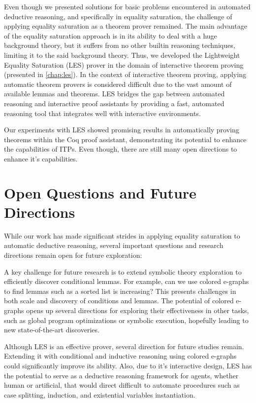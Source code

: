 Even though we presented solutions for basic problems encountered in automated deductive reasoning, and specifically in equality saturation, the challenge of applying equality saturation as a theorem prover remained.
The main advantage of the equality saturation approach is in its ability to deal with a huge background theory, but it suffers from no other builtin reasoning techniques, limiting it to the said background theory.
Thus, we developed the Lightweight Equality Saturation (LES) prover in the domain of interactive theorem proving (presented in \autoref{chap:les}).
In the context of interactive theorem proving, applying automatic theorem provers is considered difficult due to the vast amount of available lemmas and theorems.
LES bridges the gap between automated reasoning and interactive proof assistants by providing a fast, automated reasoning tool that integrates well with interactive environments. 

Our experiments with LES showed promising results in automatically proving theorems within the Coq proof assistant, demonstrating its potential to enhance the capabilities of ITPs.
Even though, there are still many open directions to enhance it's capabilities.

\section{Open Questions and Future Directions}

While our work has made significant strides in applying equality saturation to automatic deductive reasoning, several important questions and research directions remain open for future exploration:

A key challenge for future research is to extend symbolic theory exploration to efficiently discover conditional lemmas. 
For example, can we use colored e-graphs to find lemmas such as a sorted list is increasing? 
This presents challenges in both scale and discovery of conditions and lemmas.
The potential of colored e-graphs opens up several directions for exploring their effectiveness in other tasks, such as global program optimizations or symbolic execution, hopefully leading to new state-of-the-art discoveries.

Although LES is an effective prover, several direction for future studies remain. 
Extending it with conditional and inductive reasoning using colored e-graphs could significantly improve its ability.
Also, due to it's interactive design, LES has the potential to serve as a deductive reasoning framework for agents, whether human or artificial, that would direct difficult to automate procedures such as case splitting, induction, and existential variables instantiation.

